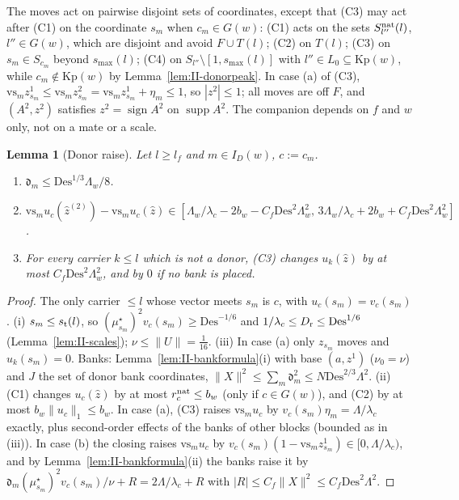 \documentclass[10pt]{amsart}
\newtheorem{lemma}[theorem]{Lemma}
\theoremstyle{definition}
\theoremstyle{remark}
\newcommand{\supp}{\operatorname{supp}}
\newcommand{\sgn}{\operatorname{sign}}
\newcommand{\zh}{\hat z}
\begin{document}
The moves act on pairwise disjoint sets of coordinates, except that (C3)
may act after (C1) on the coordinate $s_m$ when $c_m\in G(w)$: (C1) acts on
the sets $S^{\rm nat}_{l''}(l)$, $l''\in G(w)$, which are disjoint and avoid
$F\cup T(l)$; (C2) on $T(l)$; (C3) on $s_m\in S_{c_m}$ beyond $s_{\max}(l)$;
(C4) on $S_{l''}\setminus[1,s_{\max}(l)]$ with $l''\in L_0\subseteq
\mathrm{Kp}(w)$, while $c_m\notin\mathrm{Kp}(w)$ by
Lemma~\ref{lem:II-donorpeak}.  In case (a) of (C3),
$\mathrm{vs}_mz^1_{s_m}\le\mathrm{vs}_mz^2_{s_m}=\mathrm{vs}_mz^1_{s_m}+\eta_m
\le1$, so $|z^2|\le1$; all moves are off $F$, and $(A^2,z^2)$ satisfies
$z^2=\sgn A^2$ on $\supp A^2$.  The companion depends on $f$ and $w$ only,
not on a mate or a scale.

\begin{lemma}[Donor raise]\label{lem:II-donorraise}
Let $l\ge l_f$ and $m\in I_D(w)$, $c:=c_m$.
\begin{enumerate}
\item[(i)] $\mathfrak d_m\le\mathrm{Des}^{1/3}\Lambda_w/8$.
\item[(ii)] $\mathrm{vs}_mu_c(\zh^{(2)})-\mathrm{vs}_mu_c(\zh)\in[\Lambda_w/
\lambda_c-2b_w-C_f\mathrm{Des}^2\Lambda_w^2,\,3\Lambda_w/\lambda_c+2b_w+C_f
\mathrm{Des}^2\Lambda_w^2]$.
\item[(iii)] For every carrier $k\le l$ which is not a donor, (C3) changes
$u_k(\zh)$ by at most $C_f\mathrm{Des}^2\Lambda_w^2$, and by $0$ if no bank
is placed.
\end{enumerate}
\end{lemma}

\begin{proof}
The only carrier $\le l$ whose vector meets $s_m$ is $c$, with
$u_c(s_m)=v_c(s_m)$.  (i) $s_m\le s_{\rm t}(l)$, so
$(\mu^\star_{s_m})^2v_c(s_m)\ge\mathrm{Des}^{-1/6}$ and $1/\lambda_c\le
D_{\rm r}\le\mathrm{Des}^{1/6}$ (Lemma~\ref{lem:II-scales}); $\nu\le
\|U\|=\frac1{16}$.  (iii) In case (a) only $z_{s_m}$ moves and $u_k(s_m)=0$.
Banks: Lemma~\ref{lem:II-bankformula}(i) with base $(a,z^1)$ ($\nu_0=\nu$)
and $J$ the set of donor bank coordinates, $\|X\|^2\le\sum_m\mathfrak d_m^2
\le N\mathrm{Des}^{2/3}\Lambda^2$.  (ii) (C1) changes $u_c(\zh)$ by at most
$r^{\rm nat}_c\le b_w$ (only if $c\in G(w)$), and (C2) by at most $b_w\|u_c\|_1
\le b_w$.  In case (a), (C3) raises $\mathrm{vs}_mu_c$ by $v_c(s_m)\eta_m=
\Lambda/\lambda_c$ exactly, plus second-order effects of the banks of other
blocks (bounded as in (iii)).  In case (b) the closing raises
$\mathrm{vs}_mu_c$ by $v_c(s_m)(1-\mathrm{vs}_mz^1_{s_m})\in[0,\Lambda/
\lambda_c)$, and by Lemma~\ref{lem:II-bankformula}(ii) the banks raise it by
$\mathfrak d_m(\mu^\star_{s_m})^2v_c(s_m)/\nu+R=2\Lambda/\lambda_c+R$ with
$|R|\le C_f\|X\|^2\le C_f\mathrm{Des}^2\Lambda^2$.
\end{proof}
\end{document}
